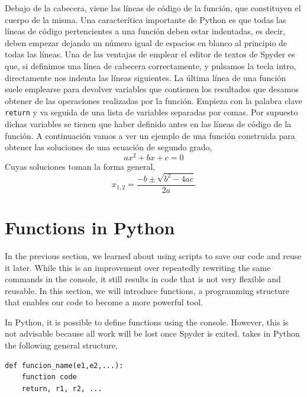 \begin{paracol}{2}
Debajo de la cabecera, viene las líneas de código de la función, que constituyen el cuerpo de la misma. Una caracterítica importante de Python es que todas las líneas de código pertencientes a una función deben estar indentadas, es decir, deben empezar dejando un número igual de espacios en blanco al principio de todas las líneas. Una de las ventajas de emplear el editor de textos de Spyder es que, si definimos una línea de cabecera correctamente,  y pulsamos la tecla intro, directamente nos indenta las líneas siguientes. La última línea de una función suele emplearse para devolver variables que contienen los resultados que desamos obtener de las operaciones realizadas por la función. Empieza con la palabra clave \texttt{return} y va seguida de una lista de variables separadas por comas. Por supuesto dichas variables se tienen que haber definido antes en las líneas de código de la función. A continuación vamos a ver un ejemplo de una función construida para obtener las soluciones de una ecuación de segundo grado,
\begin{equation*}
    ax^2+bx+c = 0
\end{equation*}
Cuyas soluciones toman la forma general,
\begin{equation*}
    x_{1,2} = \frac{-b\pm \sqrt{b^2-4ac}}{2a}
\end{equation*}
\switchcolumn
\section[Functions in Python]{Functions in Python} 
In the previous section, we learned about using scripts to save our code and reuse it later. While this is an improvement over repeatedly rewriting the same commands in the console, it still results in code that is not very flexible and reusable. In this section, we will introduce functions, a programming structure that enables our code to become a more powerful tool.

In Python, it is possible to define functions using the console. However, this is not advisable because all work will be lost once Spyder is exited. takes in Python the following general structure,

\begin{verbatim}
def funcion_name(e1,e2,...):
    function code
    return, r1, r2, ...
\end{verbatim}


\end{paracol}
